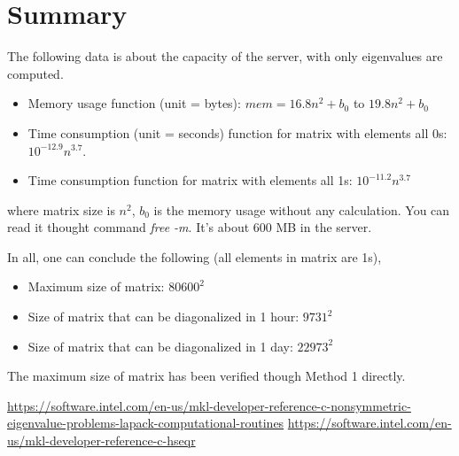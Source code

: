 \documentclass[11pt]{article}
\begin{document}
\section{Summary}

The following data is about the capacity of the server, with only eigenvalues
are computed.
\begin{itemize}
\item{Memory usage function (unit = bytes): $mem = 16.8 n^2 + b_0$ to $ 19.8 n^2 + b_0$}
\item{Time consumption (unit = seconds) function for matrix with elements all 0s: $10^{-12.9}
    n^{3.7}$.}
\item{Time consumption function for matrix with elements all 1s: $10^{-11.2} n^{3.7}$}
\end{itemize}
where matrix size is $n^2$, $b_0$ is the memory usage without any calculation.
You can read it thought command \textit{free -m}. It's about 600 MB in the
server.

In all, one can conclude the following (all elements in matrix are 1s), 
\begin{itemize}
\item{Maximum size of matrix: $80600^2$}
\item{Size of matrix that can be diagonalized in 1 hour: $9731^2$}
\item{Size of matrix that can be diagonalized in 1 day: $22973^2$}
\end{itemize}
The maximum size of matrix has been verified though Method 1 directly.

\begin{thebibliography}{100}
    \url{https://software.intel.com/en-us/mkl-developer-reference-c-nonsymmetric-eigenvalue-problems-lapack-computational-routines}
    \url{https://software.intel.com/en-us/mkl-developer-reference-c-hseqr}
\end{thebibliography}
\end{document}
